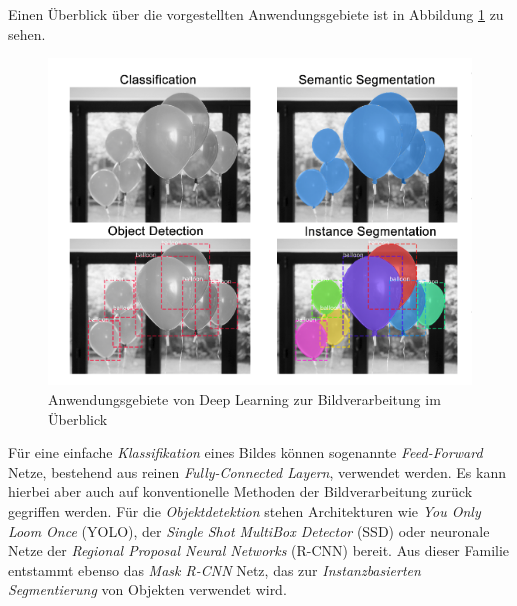 Einen Überblick über die vorgestellten Anwendungsgebiete ist in Abbildung \ref{applications} zu sehen.

\begin{figure}[ht]
	\begin{center}
		\includegraphics[width=12cm]{Bilder/applications.png} 
		\caption[Anwendungsgebiete von Deep Learning zur Bildverarbeitung im Überblick]{Anwendungsgebiete von Deep Learning zur Bildverarbeitung im Überblick \cite{PriyaDwivedi.20190328}}
		\label{applications}
	\end{center}
\end{figure}

Für eine einfache \textit{Klassifikation} eines Bildes können sogenannte \textit{Feed-Forward} Netze, bestehend aus reinen \textit{Fully-Connected Layern}, verwendet werden. Es kann hierbei aber auch auf konventionelle Methoden der Bildverarbeitung zurück gegriffen werden. Für die \textit{Objektdetektion} stehen Architekturen wie \textit{You Only Loom Once} (YOLO), der \textit{Single Shot MultiBox Detector} (SSD) oder neuronale Netze der \textit{Regional Proposal Neural Networks} (R-CNN) bereit. Aus dieser Familie entstammt ebenso das \textit{Mask R-CNN} Netz, das zur \textit{Instanzbasierten Segmentierung} von Objekten verwendet wird.
